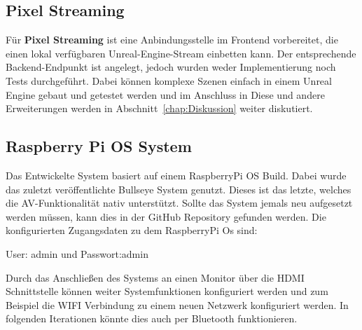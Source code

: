 \subsection{Pixel Streaming}
\label{subsec:Pixel Streaming}

Für \textbf{Pixel Streaming} ist eine Anbindungsstelle im Frontend
vorbereitet, die einen lokal verfügbaren Unreal-Engine-Stream einbetten kann.
Der entsprechende Backend-Endpunkt ist angelegt, jedoch wurden weder
Implementierung noch Tests durchgeführt. Dabei können komplexe Szenen einfach in einem Unreal Engine gebaut und getestet werden und im Anschluss in 
Diese und andere Erweiterungen werden in Abschnitt~\ref{chap:Diskussion}
weiter diskutiert.

\subsection{Raspberry Pi OS System}
\label{subsec:RaspberryPiOs}
Das Entwickelte System basiert auf einem RaspberryPi OS Build. Dabei wurde das zuletzt veröffentlichte Bullseye System genutzt. Dieses ist das letzte, welches die AV-Funktionalität nativ unterstützt. Sollte das System jemals neu aufgesetzt werden müssen, kann dies in der GitHub Repository gefunden werden. Die konfigurierten Zugangsdaten zu dem RaspberryPi Os sind:

User: admin und Passwort:admin

Durch das Anschließen des Systems an einen Monitor über die HDMI Schnittstelle können weiter Systemfunktionen konfiguriert werden und zum Beispiel die WIFI Verbindung zu einem neuen Netzwerk konfiguriert werden. In folgenden Iterationen könnte dies auch per Bluetooth funktionieren. 